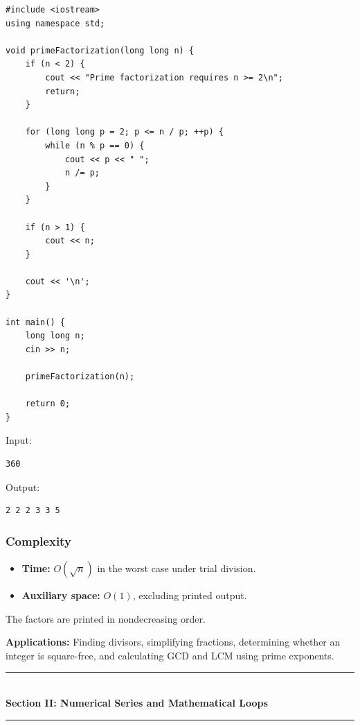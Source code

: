 \begin{lstlisting}[style=cppstyle]
#include <iostream>
using namespace std;

void primeFactorization(long long n) {
    if (n < 2) {
        cout << "Prime factorization requires n >= 2\n";
        return;
    }

    for (long long p = 2; p <= n / p; ++p) {
        while (n % p == 0) {
            cout << p << " ";
            n /= p;
        }
    }

    if (n > 1) {
        cout << n;
    }

    cout << '\n';
}

int main() {
    long long n;
    cin >> n;

    primeFactorization(n);

    return 0;
}
\end{lstlisting}

Input:

\begin{lstlisting}[style=pseudocode]
360
\end{lstlisting}

Output:

\begin{lstlisting}[style=pseudocode]
2 2 2 3 3 5
\end{lstlisting}

\subsubsection{Complexity}

\begin{itemize}
    \item \textbf{Time:} $O(\sqrt n)$ in the worst case under trial division.
    \item \textbf{Auxiliary space:} $O(1)$, excluding printed output.
\end{itemize}

The factors are printed in nondecreasing order.

\textbf{Applications:} Finding divisors, simplifying fractions, determining whether an integer is square-free, and calculating GCD and LCM using prime exponents.


\newpage
\begin{center}
\vspace{0.5em}
{\color{primary}\rule{0.45\textwidth}{1.2pt}}\\[4pt]
{\Large\bfseries\color{primary} Section II: Numerical Series and Mathematical Loops}\\[2pt]
{\color{primary}\rule{0.45\textwidth}{1.2pt}}
\vspace{0.5em}
\end{center}

